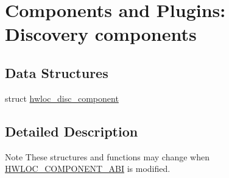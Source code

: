 \hypertarget{a00227}{}\section{Components and Plugins\+: Discovery components}
\label{a00227}
\subsection*{Data Structures}
\begin{DoxyCompactItemize}
\item 
struct \hyperlink{a00366}{hwloc\+\_\+disc\+\_\+component}
\end{DoxyCompactItemize}


\subsection{Detailed Description}
\begin{DoxyNote}{Note}
These structures and functions may change when \hyperlink{a00182_gaac5bc1f46f55e10ef0141a68ce70e21f}{H\+W\+L\+O\+C\+\_\+\+C\+O\+M\+P\+O\+N\+E\+N\+T\+\_\+\+A\+BI} is modified. 
\end{DoxyNote}
